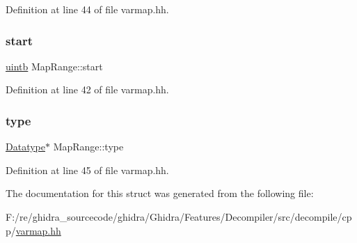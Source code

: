 Definition at line 44 of file varmap.\+hh.

\mbox{\label{struct_map_range_ae037353557a2207171b67f13cee7b3e7}} 
\subsubsection{\texorpdfstring{start}{start}}
{\footnotesize\ttfamily \mbox{\hyperlink{types_8h_a2db313c5d32a12b01d26ac9b3bca178f}{uintb}} Map\+Range\+::start}



Definition at line 42 of file varmap.\+hh.

\mbox{\label{struct_map_range_ada4eac8eb9826b1455eef173a6e5d960}} 
\subsubsection{\texorpdfstring{type}{type}}
{\footnotesize\ttfamily \mbox{\hyperlink{class_datatype}{Datatype}}$\ast$ Map\+Range\+::type}



Definition at line 45 of file varmap.\+hh.



The documentation for this struct was generated from the following file\+:\begin{DoxyCompactItemize}
\item 
F\+:/re/ghidra\+\_\+sourcecode/ghidra/\+Ghidra/\+Features/\+Decompiler/src/decompile/cpp/\mbox{\hyperlink{varmap_8hh}{varmap.\+hh}}\end{DoxyCompactItemize}
